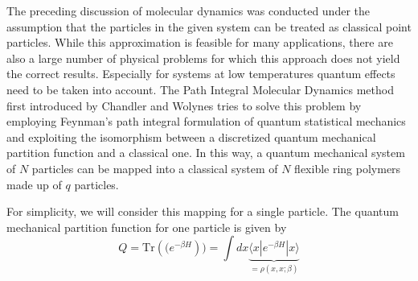 The preceding discussion of molecular dynamics was conducted under the assumption that the particles in the given system can be treated as classical point particles. While this approximation is feasible for many applications, there are also a large number of physical problems for which this approach does not yield the correct results. Especially for systems at low temperatures quantum effects need to be taken into account. The Path Integral Molecular Dynamics method first introduced by Chandler and Wolynes \cite{Chandler1980} tries to solve this problem by employing Feynman's path integral formulation of quantum statistical mechanics and exploiting the isomorphism between a discretized quantum mechanical partition function and a classical one. In this way, a quantum mechanical system of $N$ particles can be mapped into a classical system of $N$ flexible ring polymers made up of $q$ particles. 

For simplicity, we will consider this mapping for a single particle. The quantum mechanical partition function for one particle is given by 
\begin{equation}
Q = \text{Tr}\left((e^{-\beta H}\right)) = \int dx \underbrace{\langle x | e^{-\beta H} | x \rangle}_{=\rho(x, x; \beta)}
\end{equation}


